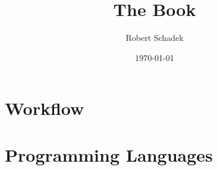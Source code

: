 \documentclass[b5paper,9pt,twocolumn]{book}
\title{The Book}
\author{Robert Schadek}
\date{\today}
\begin{document}
\maketitle
\setcounter{tocdepth}{5}
\setcounter{secnumdepth}{5}

\setlength{\parindent}{0cm}
\setlength{\columnsep}{6mm}
\tableofcontents


\part{Workflow}
\setlength{\columnseprule}{0.1pt}



%

\part{Programming Languages}


%
%
%
%
%
%
%
%
%
%
%
\end{document}
